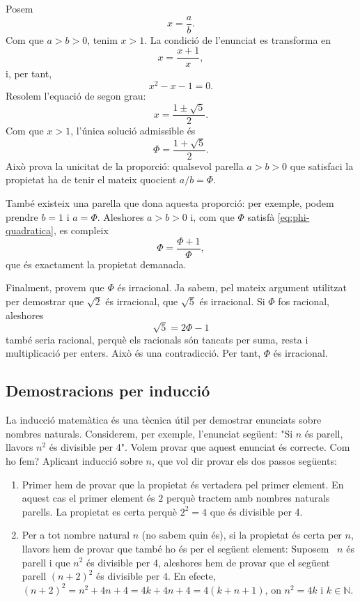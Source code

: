 \begin{solucio}
Posem
\[
x=\frac{a}{b}.
\]
Com que $a>b>0$, tenim $x>1$. La condició de l'enunciat es transforma en
\begin{equation*}
x=\frac{x+1}{x},
\end{equation*}
i, per tant,
\begin{equation}
x^{2}-x-1=0.
\label{eq:phi-quadratica}
\end{equation}
Resolem l'equació de segon grau:
\[
x=\frac{1\pm\sqrt{5}}{2}.
\]
Com que $x>1$, l'única solució admissible és
\begin{equation*}
\Phi=\frac{1+\sqrt{5}}{2}.
\end{equation*}
Això prova la unicitat de la proporció: qualsevol parella $a>b>0$ que
satisfaci la propietat ha de tenir el mateix quocient $a/b=\Phi$.

També existeix una parella que dona aquesta proporció: per exemple, podem
prendre $b=1$ i $a=\Phi$. Aleshores $a>b>0$ i, com que $\Phi$ satisfà
\eqref{eq:phi-quadratica}, es compleix
\[
\Phi=\frac{\Phi+1}{\Phi},
\]
que és exactament la propietat demanada.

Finalment, provem que $\Phi$ és irracional. Ja sabem, pel mateix argument
utilitzat per demostrar que $\sqrt{2}$ és irracional, que $\sqrt{5}$ és
irracional. Si $\Phi$ fos racional, aleshores
\[
\sqrt{5}=2\Phi-1
\]
també seria racional, perquè els racionals són tancats per suma, resta i
multiplicació per enters. Això és una contradicció. Per tant, $\Phi$ és
irracional.
\end{solucio}

\subsection{Demostracions per inducció\label{subsec:induccio}}

La inducció matemàtica és una tècnica útil per demostrar
enunciats sobre nombres naturals. Considerem, per exemple, l'enunciat següent: "Si $n$ és parell, llavors $n^{2}$ és divisible per 4".
Volem provar que aquest enunciat és correcte. Com ho fem? Aplicant
inducció sobre $n$, que vol dir provar els dos passos següents:

\begin{enumerate}
\item Primer hem de provar que la propietat és vertadera pel primer
element. En aquest cas el primer element és $2$ perquè tractem amb
nombres naturals parells. La propietat es certa perquè $2^{2}=4$ que
és divisible per 4.

\item Per a tot nombre natural $n$ (no sabem quin és), si la propietat
és certa per $n$, llavors hem de provar que també ho és per el
següent element: Suposem \ $n$ és parell i que $n^{2}$ és
divisible per 4, aleshores hem de provar que el següent parell $(n+2)^{2} $ és divisible per 4. En efecte, $(n+2)^{2}=n^{2}+4n+4=4k+4n+4=4(k+n+1)$, on $n^{2}=4k$ i $k\in\mathbb{N}$.
\end{enumerate}

